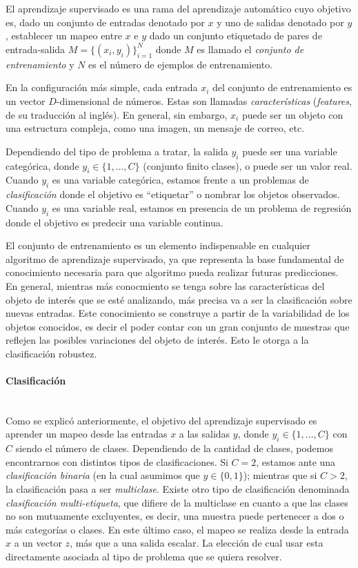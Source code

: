 	El aprendizaje supervisado es una rama del aprendizaje automático cuyo objetivo es, dado un conjunto de entradas denotado por $x$ y uno de salidas denotado por $y$, establecer un mapeo entre $x$ e $y$ dado un conjunto etiquetado de pares de entrada-salida $M=\{(x_i,y_i)\}^{N}_{i=1}$ donde $M$ es llamado el \textit{conjunto de entrenamiento} y $N$ es el número de ejemplos de entrenamiento.
	
	En la configuración más simple, cada entrada $x_i$ del conjunto de entrenamiento es un vector $D$-dimensional de números. Estas son llamadas \textit{características} (\textit{features}, de su traducción al inglés). En general, sin embargo, $x_i$ puede ser un objeto con una estructura compleja, como una imagen, un mensaje de correo, etc.
	
	Dependiendo del tipo de problema a tratar, la salida $y_i$ puede ser una variable categórica, donde $y_i \in \{1,\dots,C\}$ (conjunto finito clases), o puede ser un valor real. Cuando $y_i$ es una variable categórica, estamos frente a un problemas de \textit{clasificación} donde el objetivo es ``etiquetar'' o nombrar los objetos observados. Cuando $y_i$ es una variable real, estamos en presencia de un problema de regresión donde el objetivo es predecir una variable continua.
	
	El conjunto de entrenamiento es un elemento indispensable en cualquier algoritmo de aprendizaje supervisado, ya que representa la base fundamental de conocimiento necesaria para que algoritmo pueda realizar futuras predicciones. En general, mientras más conocmiento se tenga sobre las características del objeto de interés que se esté analizando, más precisa va a ser la clasificación sobre nuevas entradas. Este conocimiento se construye a partir de la variabilidad de los objetos conocidos, es decir el poder contar con un gran conjunto de muestras que reflejen las posibles variaciones del objeto de interés. Esto le otorga a la clasificación robustez.
	
	\paragraph{Clasificación}  ~\\
	
		Como se explicó anteriormente, el objetivo del aprendizaje supervisado es aprender un mapeo desde las entradas $x$ a las salidas $y$, donde $y_i \in \{1,\dots,C\}$ con $C$ siendo el número de clases. Dependiendo de la cantidad de clases, podemos encontrarnos con distintos tipos de clasificaciones. Si $C=2$, estamos ante una \textit{clasificación binaria} (en la cual asumimos que $y\in\{0,1\}$); mientras que si $C>2$, la clasificación pasa a ser \textit{multiclase}. Existe otro tipo de clasificación denominada \textit{clasificación multi-etiqueta}, que difiere de la multiclase en cuanto a que las clases no son mutuamente excluyentes, es decir, una muestra puede pertenecer a dos o más categorías o clases. En este último caso, el mapeo se realiza desde la entrada $x$ a un vector $z$, más que a una salida escalar. La elección de cual usar esta directamente asociada al tipo de problema que se quiera resolver.
		
